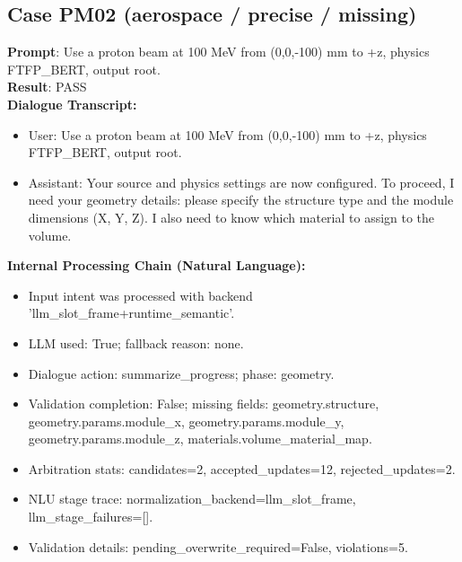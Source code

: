 \documentclass[11pt]{ctexart}
\begin{document}
\subsection{Case PM02 (aerospace / precise / missing)}
\textbf{Prompt}: Use a proton beam at 100 MeV from (0,0,-100) mm to +z, physics FTFP\_BERT, output root.\\
\textbf{Result}: PASS\\
\textbf{Dialogue Transcript:}
\begin{itemize}
\item User: Use a proton beam at 100 MeV from (0,0,-100) mm to +z, physics FTFP\_BERT, output root.
\item Assistant: Your source and physics settings are now configured. To proceed, I need your geometry details: please specify the structure type and the module dimensions (X, Y, Z). I also need to know which material to assign to the volume.
\end{itemize}
\textbf{Internal Processing Chain (Natural Language):}
\begin{itemize}
\item Input intent was processed with backend 'llm\_slot\_frame+runtime\_semantic'.
\item LLM used: True; fallback reason: none.
\item Dialogue action: summarize\_progress; phase: geometry.
\item Validation completion: False; missing fields: geometry.structure, geometry.params.module\_x, geometry.params.module\_y, geometry.params.module\_z, materials.volume\_material\_map.
\item Arbitration stats: candidates=2, accepted\_updates=12, rejected\_updates=2.
\item NLU stage trace: normalization\_backend=llm\_slot\_frame, llm\_stage\_failures=[].
\item Validation details: pending\_overwrite\_required=False, violations=5.
\end{itemize}
\end{document}
